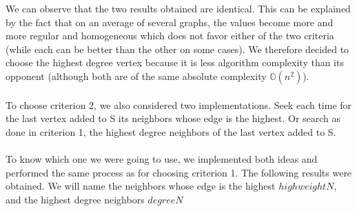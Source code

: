 We can observe that the two results obtained are identical. This can be explained by the fact that on an average of several graphs, the values become more and more regular and homogeneous which does not favor either of the two criteria (while each can be better than the other on some cases). We therefore decided to choose the highest degree vertex because it is less algorithm complexity than its opponent (although both are of the same absolute complexity $\mathbb{O}(n^2)$).
\\ \\
To choose criterion 2, we also considered two implementations. Seek each time for the last vertex added to S its neighbors whose edge is the highest. Or search as done in criterion 1, the highest degree neighbors of the last vertex added to S.
\\ \\
To know which one we were going to use, we implemented both ideas and performed the same process as for choosing criterion 1. The following results were obtained. We will name the neighbors whose edge is the highest $highweightN$, and the highest degree neighbors $degreeN$
\\ \\
